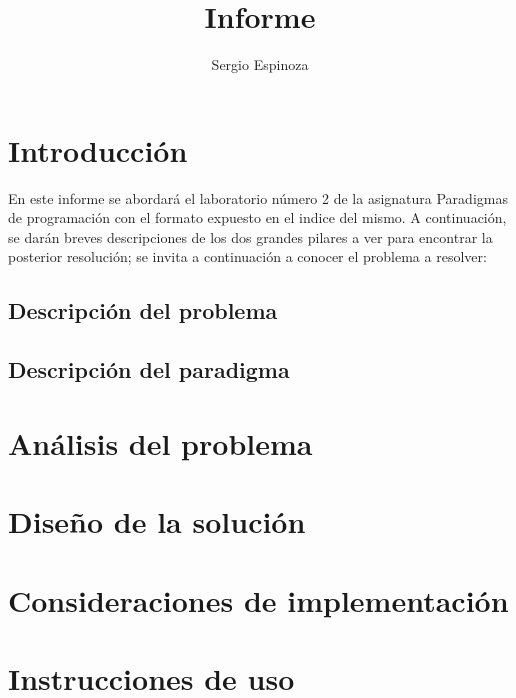 \documentclass[10pt,letterpaper,openany]{article}
\title{Informe}
\author{Sergio Espinoza}
\begin{document}
    
    
    \tableofcontents
    \listoftables
    \newpage

    
    \section{Introducción}
    En este informe se abordará el laboratorio número 2 de la asignatura Paradigmas de programación
    con el formato expuesto en el indice del mismo. A continuación, se darán breves descripciones
    de los dos grandes pilares a ver para encontrar la posterior resolución; se invita a continuación
    a conocer el problema a resolver:  
        \subsection{Descripción del problema}
            
        \subsection{Descripción del paradigma}
            

    
    \section{Análisis del problema}
        

    \section{Diseño de la solución}\label{sec:diseño}
        

    \section{Consideraciones de implementación}
        

    \section{Instrucciones de uso}
        
\end{document}
